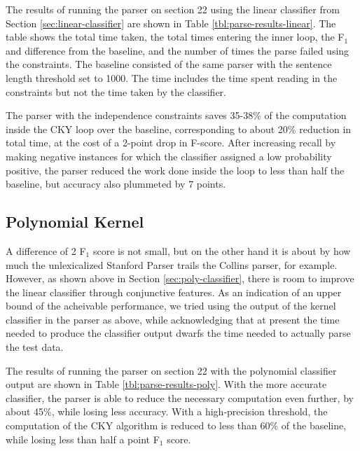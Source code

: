 \documentclass[11pt]{article}
\begin{document}
The results of running the parser on section 22 using the linear
classifier from Section \ref{sec:linear-classifier} are shown in
Table \ref{tbl:parse-results-linear}. The table shows the total time
taken, the total times entering the inner loop, the F$_{\text{1}}$ and difference
from the baseline, and the number of times the parse failed using the
constraints. The baseline consisted of the same parser with the
sentence length threshold set to 1000. The time includes the time
spent reading in the constraints but not the time taken by the
classifier.

The parser with the independence constraints saves 35-38\%
of the computation inside the CKY loop over the baseline,
corresponding to about 20\% reduction in total time, at the cost of a
2-point drop in F-score. After increasing recall by making negative
instances for which the classifier assigned a low probability positive,
the parser reduced the work done inside the loop to less than half the
baseline, but accuracy also plummeted by 7 points.

\subsection{Polynomial Kernel}
\label{sec-5-3}

A difference of 2 F$_{\text{1}}$ score is not small, but on the other hand it is
about by how much the unlexicalized Stanford Parser trails the Collins
parser, for example. However, as shown above in Section
\ref{sec:poly-classifier}, there is room to improve the linear
classifier through conjunctive features. As an indication of an upper
bound of the acheivable performance, we tried using the output of the
kernel classifier in the parser as above, while acknowledging that at
present the time needed to produce the classifier output dwarfs the
time needed to actually parse the test data.

The results of running the parser on section 22 with the polynomial
classifier output are shown in Table \ref{tbl:parse-results-poly}.
With the more accurate classifier, the parser is able to reduce the
necessary computation even further, by about 45\%, while losing less
accuracy. With a high-precision threshold, the computation of the CKY
algorithm is reduced to less than 60\% of the baseline, while losing
less than half a point F$_{\text{1}}$ score.
\end{document}
